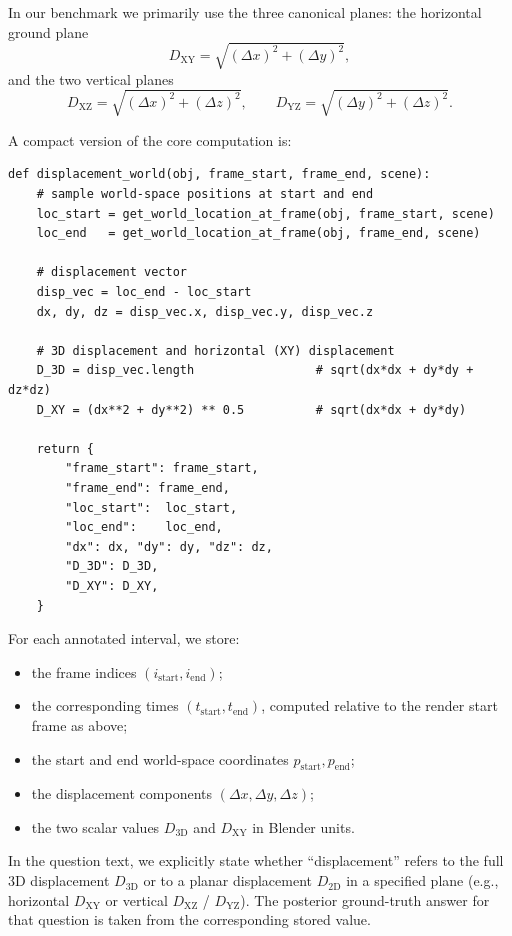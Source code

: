 In our benchmark we primarily use the three canonical planes:
the horizontal ground plane
\[
D_{\text{XY}} = \sqrt{(\Delta x)^2 + (\Delta y)^2},
\]
and the two vertical planes
\[
D_{\text{XZ}} = \sqrt{(\Delta x)^2 + (\Delta z)^2}, \qquad
D_{\text{YZ}} = \sqrt{(\Delta y)^2 + (\Delta z)^2}.
\]

A compact version of the core computation is:

\begin{verbatim}
def displacement_world(obj, frame_start, frame_end, scene):
    # sample world-space positions at start and end
    loc_start = get_world_location_at_frame(obj, frame_start, scene)
    loc_end   = get_world_location_at_frame(obj, frame_end, scene)

    # displacement vector
    disp_vec = loc_end - loc_start
    dx, dy, dz = disp_vec.x, disp_vec.y, disp_vec.z

    # 3D displacement and horizontal (XY) displacement
    D_3D = disp_vec.length                 # sqrt(dx*dx + dy*dy + dz*dz)
    D_XY = (dx**2 + dy**2) ** 0.5          # sqrt(dx*dx + dy*dy)

    return {
        "frame_start": frame_start,
        "frame_end": frame_end,
        "loc_start":  loc_start,
        "loc_end":    loc_end,
        "dx": dx, "dy": dy, "dz": dz,
        "D_3D": D_3D,
        "D_XY": D_XY,
    }
\end{verbatim}


For each annotated interval, we store:
\begin{itemize}
  \item the frame indices \((i_{\text{start}}, i_{\text{end}})\);
  \item the corresponding times \((t_{\text{start}}, t_{\text{end}})\), computed relative to the render start frame as above;
  \item the start and end world-space coordinates \(p_{\text{start}}, p_{\text{end}}\);
  \item the displacement components \((\Delta x, \Delta y, \Delta z)\);
  \item the two scalar values \(D_{\text{3D}}\) and \(D_{\text{XY}}\) in Blender units.
\end{itemize}

In the question text, we explicitly state whether “displacement” refers to the full 3D displacement \(D_{\text{3D}}\) or to a planar displacement \(D_{2\text{D}}\) in a specified plane (e.g., horizontal \(D_{\text{XY}}\) or vertical \(D_{\text{XZ}}\) / \(D_{\text{YZ}}\)). 
The posterior ground-truth answer for that question is taken from the corresponding stored value.


